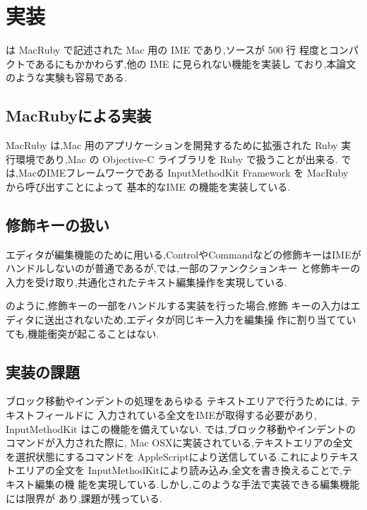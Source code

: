 \section{実装}

{\system} は MacRuby で記述された Mac 用の IME であり,ソースが 500 行
程度とコンパクトであるにもかかわらず,他の IME に見られない機能を実装し
ており,本論文のような実験も容易である.

\subsection{MacRubyによる実装}

MacRuby は,Mac 用のアプリケーションを開発するために拡張された Ruby 実
行環境であり,Mac の Objective-C ライブラリを Ruby で扱うことが出来る.
%
{\system} では,MacのIMEフレームワークである
InputMethodKit Framework を MacRuby から呼び出すことによって
基本的なIME の機能を実装している.

\subsection{修飾キーの扱い}

エディタが編集機能のために用いる,ControlやCommandなどの修飾キーはIMEが
ハンドルしないのが普通であるが,{\system}では,一部のファンクションキー
と修飾キーの入力を受け取り,共通化されたテキスト編集操作を実現している.

{\system} のように,修飾キーの一部をハンドルする実装を行った場合,修飾
キーの入力はエディタに送出されないため,エディタが同じキー入力を編集操
作に割り当てていても,機能衝突が起こることはない.

\subsection{実装の課題}

ブロック移動やインデントの処理をあらゆる テキストエリアで行うためには,
テキストフィールドに 入力されている全文をIMEが取得する必要があり,
InputMethodKit はこの機能を備えていない.
%
{\system} では,ブロック移動やインデントのコマンドが入力された際に,
Mac OSXに実装されている,テキストエリアの全文を選択状態にするコマンドを
AppleScriptにより送信している.これによりテキストエリアの全文を
InputMethodKitにより読み込み,全文を書き換えることで,テキスト編集の機
能を実現している.しかし,このような手法で実装できる編集機能には限界が
あり,課題が残っている.
